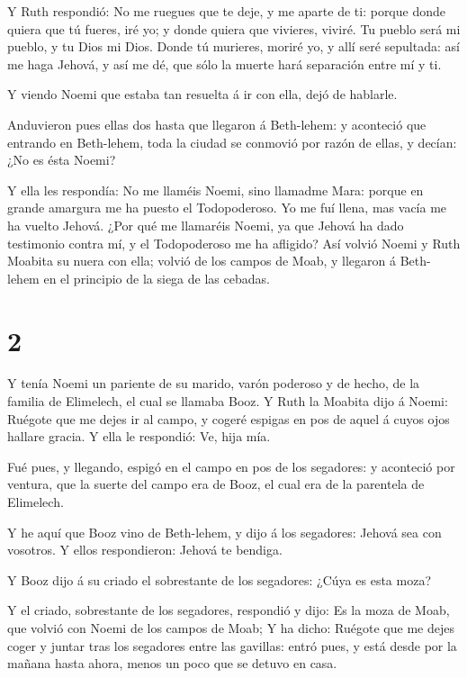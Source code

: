  Y Ruth respondió: No me ruegues que te deje, y me aparte
de ti: porque donde quiera que tú fueres, iré yo; y donde quiera que
vivieres, viviré. Tu pueblo será mi pueblo, y tu Dios mi Dios.
 Donde tú murieres, moriré yo, y allí seré sepultada: así
me haga Jehová, y así me dé, que sólo la muerte hará separación entre mí
y ti.

 Y viendo Noemi que estaba tan resuelta á ir con ella, dejó
de hablarle.

 Anduvieron pues ellas dos hasta que llegaron á Beth-lehem:
y aconteció que entrando en Beth-lehem, toda la ciudad se conmovió por
razón de ellas, y decían: ¿No es ésta Noemi?

 Y ella les respondía: No me llaméis Noemi, sino llamadme
Mara: porque en grande amargura me ha puesto el Todopoderoso.
 Yo me fuí llena, mas vacía me ha vuelto Jehová. ¿Por qué
me llamaréis Noemi, ya que Jehová ha dado testimonio contra mí, y el
Todopoderoso me ha afligido?  Así volvió Noemi y Ruth
Moabita su nuera con ella; volvió de los campos de Moab, y llegaron á
Beth-lehem en el principio de la siega de las cebadas.

\hypertarget{section-1}{%
\section{2}\label{section-1}}

 Y tenía Noemi un pariente de su marido, varón poderoso y de
hecho, de la familia de Elimelech, el cual se llamaba Booz. 
Y Ruth la Moabita dijo á Noemi: Ruégote que me dejes ir al campo, y
cogeré espigas en pos de aquel á cuyos ojos hallare gracia. Y ella le
respondió: Ve, hija mía.

 Fué pues, y llegando, espigó en el campo en pos de los
segadores: y aconteció por ventura, que la suerte del campo era de Booz,
el cual era de la parentela de Elimelech.

 Y he aquí que Booz vino de Beth-lehem, y dijo á los
segadores: Jehová sea con vosotros. Y ellos respondieron: Jehová te
bendiga.

 Y Booz dijo á su criado el sobrestante de los segadores:
¿Cúya es esta moza?

 Y el criado, sobrestante de los segadores, respondió y
dijo: Es la moza de Moab, que volvió con Noemi de los campos de Moab;
 Y ha dicho: Ruégote que me dejes coger y juntar tras los
segadores entre las gavillas: entró pues, y está desde por la mañana
hasta ahora, menos un poco que se detuvo en casa.


